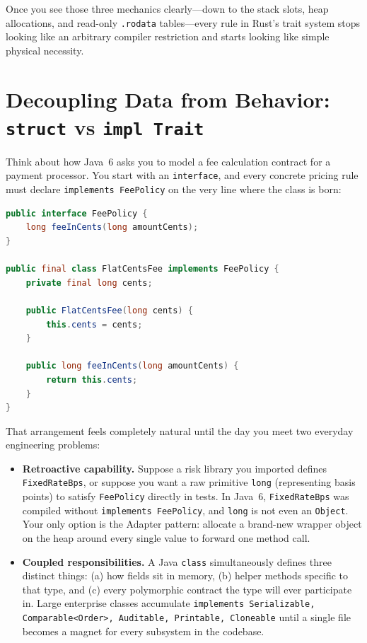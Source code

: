 Once you see those three mechanics clearly---down to the stack slots, heap allocations, and read-only \texttt{.rodata} tables---every rule in Rust's trait system stops looking like an arbitrary compiler restriction and starts looking like simple physical necessity.

\chapterline

\section{Decoupling Data from Behavior: \texttt{struct} vs \texttt{impl Trait}}
\label{ch06:data-vs-behavior}

Think about how Java~6 asks you to model a fee calculation contract for a payment processor. You start with an \texttt{interface}, and every concrete pricing rule must declare \texttt{implements FeePolicy} on the very line where the class is born:

\begin{lstlisting}[language=Java, caption={Java 6 fuses memory layout, inherent methods, and interface membership inside a single class declaration.}]
public interface FeePolicy {
    long feeInCents(long amountCents);
}

public final class FlatCentsFee implements FeePolicy {
    private final long cents;

    public FlatCentsFee(long cents) {
        this.cents = cents;
    }

    public long feeInCents(long amountCents) {
        return this.cents;
    }
}
\end{lstlisting}

That arrangement feels completely natural until the day you meet two everyday engineering problems:

\begin{itemize}
  \item \textbf{Retroactive capability.} Suppose a risk library you imported defines \texttt{FixedRateBps}, or suppose you want a raw primitive \texttt{long} (representing basis points) to satisfy \texttt{FeePolicy} directly in tests. In Java~6, \texttt{FixedRateBps} was compiled without \texttt{implements FeePolicy}, and \texttt{long} is not even an \texttt{Object}. Your only option is the Adapter pattern: allocate a brand-new wrapper object on the heap around every single value to forward one method call.
  \item \textbf{Coupled responsibilities.} A Java \texttt{class} simultaneously defines three distinct things: (a) how fields sit in memory, (b) helper methods specific to that type, and (c) every polymorphic contract the type will ever participate in. Large enterprise classes accumulate \texttt{implements Serializable, Comparable<Order>, Auditable, Printable, Cloneable} until a single file becomes a magnet for every subsystem in the codebase.
\end{itemize}

